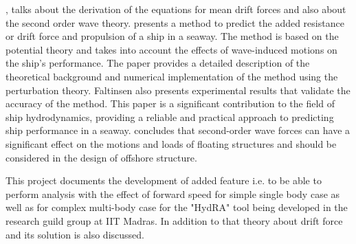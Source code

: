 \cite{faltinsen1980prediction},  \cite{pinkster1980low} talks about the derivation of the equations 
for mean drift forces and also about the second order wave theory. 
\cite{faltinsen1980prediction} presents a method to predict the added resistance or drift force 
and propulsion of a ship in a seaway. 
The method is based on the potential theory and takes into account the 
effects of wave-induced motions on the ship's performance. The paper provides a detailed 
description of the theoretical background and numerical implementation of the method using
the perturbation theory. 
Faltinsen also presents experimental results that validate the accuracy of the method. 
This paper is a significant contribution to the field of ship hydrodynamics, providing a 
reliable and practical approach to predicting ship performance in a seaway.
\cite{pinkster1980low} concludes that second-order wave forces can have a significant
effect on the motions and loads of floating structures and should be considered in the 
design of offshore structure.

This project documents the development of added feature i.e. to be able to perform analysis 
with the effect of forward speed for simple single body case as well as for complex multi-body
case for the "HydRA" tool being developed in the research guild group at IIT Madras. In addition to 
that theory about drift force and its solution is also discussed. 